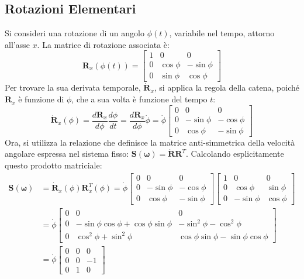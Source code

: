 \documentclass[11pt, a4paper]{report}
\begin{document}
\subsection{Rotazioni Elementari}
Si consideri una rotazione di un angolo \(\phi(t)\), variabile nel tempo, attorno all'asse \(x\). La matrice di rotazione associata è:
\[
    \bm{R}_x(\phi(t)) =
    \begin{bmatrix}
        1 & 0 & 0 \\
        0 & \cos\phi & -\sin\phi \\
        0 & \sin\phi & \cos\phi
    \end{bmatrix}
\]
Per trovare la sua derivata temporale, \(\dot{\bm{R}}_x\), si applica la regola della catena, poiché \(\bm{R}_x\) è funzione di \(\phi\), che a sua volta è funzione del tempo \(t\):
\[
    \dot{\bm{R}}_x(\phi) = \frac{d\bm{R}_x}{d\phi}\frac{d\phi}{dt} = \frac{d\bm{R}_x}{d\phi} \dot{\phi} =
    \dot{\phi}
    \begin{bmatrix}
        0 & 0 & 0 \\
        0 & -\sin\phi & -\cos\phi \\
        0 & \cos\phi & -\sin\phi
    \end{bmatrix}
\]
Ora, si utilizza la relazione che definisce la matrice anti-simmetrica della velocità angolare espressa nel sistema fisso: \(\bm{S}(\bm{\omega}) = \dot{\bm{R}}\bm{R}^T\). Calcolando esplicitamente questo prodotto matriciale:
\begin{align*}
    \bm{S}(\bm{\omega}) &= \dot{\bm{R}}_x(\phi)\bm{R}_x^T(\phi) =
    \dot{\phi}
    \begin{bmatrix}
        0 & 0 & 0 \\
        0 & -\sin\phi & -\cos\phi \\
        0 & \cos\phi & -\sin\phi
    \end{bmatrix}
    \begin{bmatrix}
        1 & 0 & 0 \\
        0 & \cos\phi & \sin\phi \\
        0 & -\sin\phi & \cos\phi
    \end{bmatrix} \\
    &=
    \dot{\phi}
    \begin{bmatrix}
        0 & 0 & 0 \\
        0 & -\sin\phi\cos\phi + \cos\phi\sin\phi & -\sin^2\phi - \cos^2\phi \\
        0 & \cos^2\phi + \sin^2\phi & \cos\phi\sin\phi - \sin\phi\cos\phi
    \end{bmatrix} \\
    &=
    \dot{\phi}
    \begin{bmatrix}
        0 & 0 & 0 \\
        0 & 0 & -1 \\
        0 & 1 & 0
    \end{bmatrix}
\end{align*}
\end{document}
